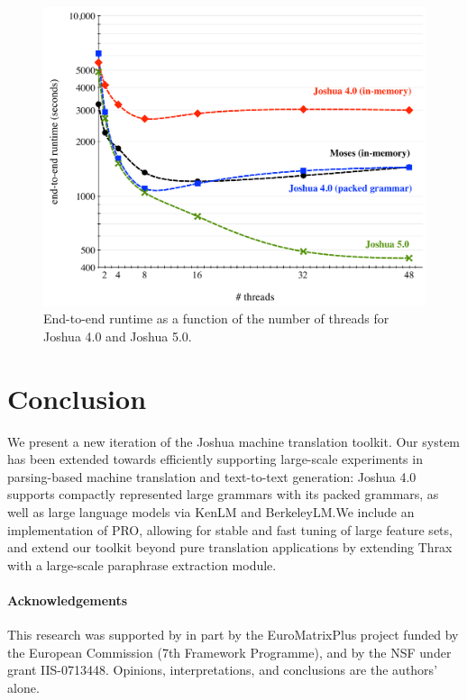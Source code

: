 \documentclass[11pt]{article}
\begin{document}
\begin{figure}[!t]
  \begin{center}
    \includegraphics[width=0.99\linewidth]{figures/comparison.pdf}
  \end{center}
  \label{fig:cmp}
  \caption{End-to-end runtime as a function of the number of threads
    for Joshua 4.0 and Joshua 5.0.}
\end{figure}

\subsection{}



\section{Conclusion}

We present a new iteration of the Joshua machine translation
toolkit. Our system has been extended towards efficiently supporting
large-scale experiments in parsing-based machine translation and
text-to-text generation: Joshua 4.0 supports compactly represented
large grammars with its packed grammars, as well as large language
models via KenLM and BerkeleyLM.We include an implementation of PRO,
allowing for stable and fast tuning of large feature sets, and extend
our toolkit beyond pure translation applications by extending Thrax
with a large-scale paraphrase extraction module.

\paragraph{Acknowledgements}

This research was supported by in part by the EuroMatrixPlus project
funded by the European Commission (7th Framework Programme), and by
the NSF under grant IIS-0713448. Opinions, interpretations, and
conclusions are the authors' alone.



\end{document}
